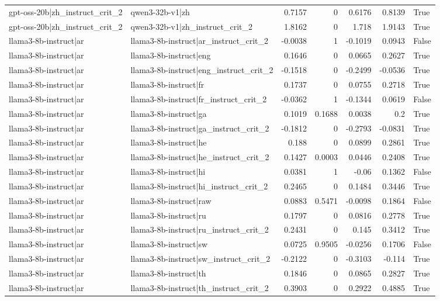 \begin{table}
\begin{tabular}{l l r r r r l}
gpt-oss-20b|zh_instruct_crit_2 & qwen3-32b-v1|zh & 0.7157 & 0 & 0.6176 & 0.8139 & True \\
gpt-oss-20b|zh_instruct_crit_2 & qwen3-32b-v1|zh_instruct_crit_2 & 1.8162 & 0 & 1.718 & 1.9143 & True \\
llama3-8b-instruct|ar & llama3-8b-instruct|ar_instruct_crit_2 & -0.0038 & 1 & -0.1019 & 0.0943 & False \\
llama3-8b-instruct|ar & llama3-8b-instruct|eng & 0.1646 & 0 & 0.0665 & 0.2627 & True \\
llama3-8b-instruct|ar & llama3-8b-instruct|eng_instruct_crit_2 & -0.1518 & 0 & -0.2499 & -0.0536 & True \\
llama3-8b-instruct|ar & llama3-8b-instruct|fr & 0.1737 & 0 & 0.0755 & 0.2718 & True \\
llama3-8b-instruct|ar & llama3-8b-instruct|fr_instruct_crit_2 & -0.0362 & 1 & -0.1344 & 0.0619 & False \\
llama3-8b-instruct|ar & llama3-8b-instruct|ga & 0.1019 & 0.1688 & 0.0038 & 0.2 & True \\
llama3-8b-instruct|ar & llama3-8b-instruct|ga_instruct_crit_2 & -0.1812 & 0 & -0.2793 & -0.0831 & True \\
llama3-8b-instruct|ar & llama3-8b-instruct|he & 0.188 & 0 & 0.0899 & 0.2861 & True \\
llama3-8b-instruct|ar & llama3-8b-instruct|he_instruct_crit_2 & 0.1427 & 0.0003 & 0.0446 & 0.2408 & True \\
llama3-8b-instruct|ar & llama3-8b-instruct|hi & 0.0381 & 1 & -0.06 & 0.1362 & False \\
llama3-8b-instruct|ar & llama3-8b-instruct|hi_instruct_crit_2 & 0.2465 & 0 & 0.1484 & 0.3446 & True \\
llama3-8b-instruct|ar & llama3-8b-instruct|raw & 0.0883 & 0.5471 & -0.0098 & 0.1864 & False \\
llama3-8b-instruct|ar & llama3-8b-instruct|ru & 0.1797 & 0 & 0.0816 & 0.2778 & True \\
llama3-8b-instruct|ar & llama3-8b-instruct|ru_instruct_crit_2 & 0.2431 & 0 & 0.145 & 0.3412 & True \\
llama3-8b-instruct|ar & llama3-8b-instruct|sw & 0.0725 & 0.9505 & -0.0256 & 0.1706 & False \\
llama3-8b-instruct|ar & llama3-8b-instruct|sw_instruct_crit_2 & -0.2122 & 0 & -0.3103 & -0.114 & True \\
llama3-8b-instruct|ar & llama3-8b-instruct|th & 0.1846 & 0 & 0.0865 & 0.2827 & True \\
llama3-8b-instruct|ar & llama3-8b-instruct|th_instruct_crit_2 & 0.3903 & 0 & 0.2922 & 0.4885 & True \\

\end{tabular}
\end{table}
